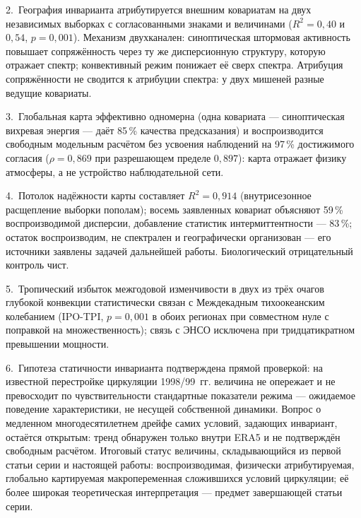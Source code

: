 \documentclass[11pt,a4paper]{article}
\begin{document}
2.~География инварианта атрибутируется внешним ковариатам на двух независимых выборках с согласованными знаками и величинами ($R^2=0{,}40$ и $0{,}54$, $p=0{,}001$). Механизм двухканален: синоптическая штормовая активность повышает сопряжённость через ту же дисперсионную структуру, которую отражает спектр; конвективный режим понижает её сверх спектра. Атрибуция сопряжённости не сводится к атрибуции спектра: у двух мишеней разные ведущие ковариаты.

3.~Глобальная карта эффективно одномерна (одна ковариата --- синоптическая вихревая энергия --- даёт 85\,\% качества предсказания) и воспроизводится свободным модельным расчётом без усвоения наблюдений на 97\,\% достижимого согласия ($\rho=0{,}869$ при разрешающем пределе $0{,}897$): карта отражает физику атмосферы, а не устройство наблюдательной сети.

4.~Потолок надёжности карты составляет $R^2=0{,}914$ (внутрисезонное расщепление выборки пополам); восемь заявленных ковариат объясняют 59\,\% воспроизводимой дисперсии, добавление статистик интермиттентности --- 83\,\%; остаток воспроизводим, не спектрален и географически организован --- его источники заявлены задачей дальнейшей работы. Биологический отрицательный контроль чист.

5.~Тропический избыток межгодовой изменчивости в двух из трёх очагов глубокой конвекции статистически связан с Междекадным тихоокеанским колебанием (IPO-TPI, $p=0{,}001$ в обоих регионах при совместном нуле с поправкой на множественность); связь с ЭНСО исключена при тридцатикратном превышении мощности.

6.~Гипотеза статичности инварианта подтверждена прямой проверкой: на известной перестройке циркуляции 1998/99~гг. величина не опережает и не превосходит по чувствительности стандартные показатели режима --- ожидаемое поведение характеристики, не несущей собственной динамики. Вопрос о медленном многодесятилетнем дрейфе самих условий, задающих инвариант, остаётся открытым: тренд обнаружен только внутри ERA5 и не подтверждён свободным расчётом. Итоговый статус величины, складывающийся из первой статьи серии и настоящей работы: воспроизводимая, физически атрибутируемая, глобально картируемая макропеременная сложившихся условий циркуляции; её более широкая теоретическая интерпретация --- предмет завершающей статьи серии.
\end{document}
